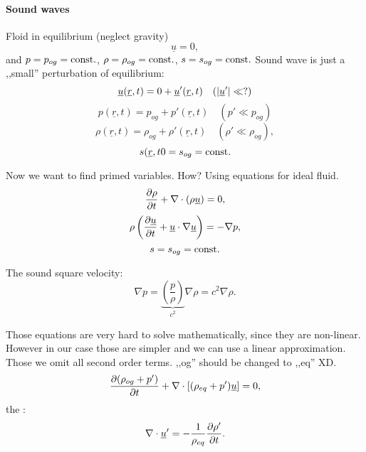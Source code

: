 \documentclass[11pt,oneside]{book}
\renewcommand{\vec}[1]{\underline{#1}}
\theoremstyle{definition} %
\theoremstyle{plain} %
\theoremstyle{remark} %
\theoremstyle{underline}
\begin{document}
  \paragraph{Sound waves}
  Floid in equilibrium (neglect gravity)
  \begin{displaymath}
    \vec u = 0,
  \end{displaymath}
  and $p = p_{og} = \textrm{const}.$, $\rho = \rho_{og} = \textrm{const}.$, $s = s_{og} = \textrm{const}.$
  Sound wave is just a ,,small'' perturbation of equilibrium:
  \begin{displaymath}
    \vec u ( \vec r, t) = 0 + \vec u ' (\vec r, t)  \quad (\abs{\vec u'} \ll ?)
  \end{displaymath}
  \begin{displaymath}
    p ( \vec r, t) = p_{og} + p' (\vec r, t)  \quad (p' \ll p_{og})
  \end{displaymath}
  \begin{displaymath}
    \rho ( \vec r, t) = \rho_{og} + \rho' (\vec r, t)  \quad (\rho ' \ll \rho_{og}),
  \end{displaymath}
  \begin{displaymath}
    s( \vec r, t0 = s_{og} = \const.
  \end{displaymath}

  Now we want to find primed variables.
  How? Using equations for ideal fluid.
  \begin{displaymath}
    \ptf{\rho}{t} + \nabla \cdot (\rho \vec u) = 0,
  \end{displaymath}
  \begin{displaymath}
    \rho \left( \ptf{\vec u}{t} + \vec u \cdot \nabla\vec u \right) = - \nabla p,
  \end{displaymath}
  \begin{displaymath}
    s = s_{og} = \textrm{const}.
  \end{displaymath}

  The sound square velocity:
  \begin{displaymath}
    \nabla p = \underbrace{\left( \dfrac{p}{\rho} \right)}_{c^2}\nabla \rho = c^2 \nabla \rho.
  \end{displaymath}
  
  Those equations are very hard to solve mathematically, since they are non-linear.
  However in our case those are simpler and we can use a linear approximation.
  Those we omit all second order terms. \todo ,,og'' should be changed to ,,eq'' XD.
  \begin{displaymath}
    \ptf{(\rho_{og} + p')}{t} + \nabla \cdot \left[ (\rho_{eq} + p') \vec u \right] = 0,
  \end{displaymath}
  the :
  \begin{equation}
    \nabla \cdot \vec u' = - \frac{1}{\rho_{eq}} \ptf{\rho'}{t}.
    \label{eq:lincont}
  \end{equation}
\end{document}
